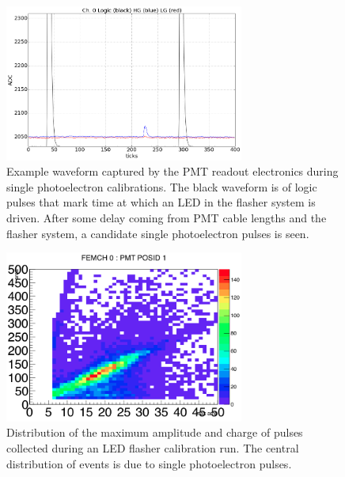 \begin{figure}
\centering 
\includegraphics[width=0.7\textwidth]{./figures/sample_flasher_spe.png}
\caption{Example waveform captured by the PMT readout electronics during single photoelectron calibrations.  The black waveform is of logic pulses that mark time at which an LED in the flasher system is driven.  After some delay coming from PMT cable lengths and the flasher system, a candidate single photoelectron pulses is seen.}
 \label{fig:example_spe_wfm}
 \end{figure}


\begin{figure}
\centering 
\includegraphics[width=0.7\textwidth]{./figures/h2_ch0_pmt1.png}
\caption{Distribution of the maximum amplitude and charge of pulses collected during an LED flasher calibration run. The central distribution of events is due to single photoelectron pulses.}
 \label{fig:example_spe_pulsedist} 
\end{figure}





